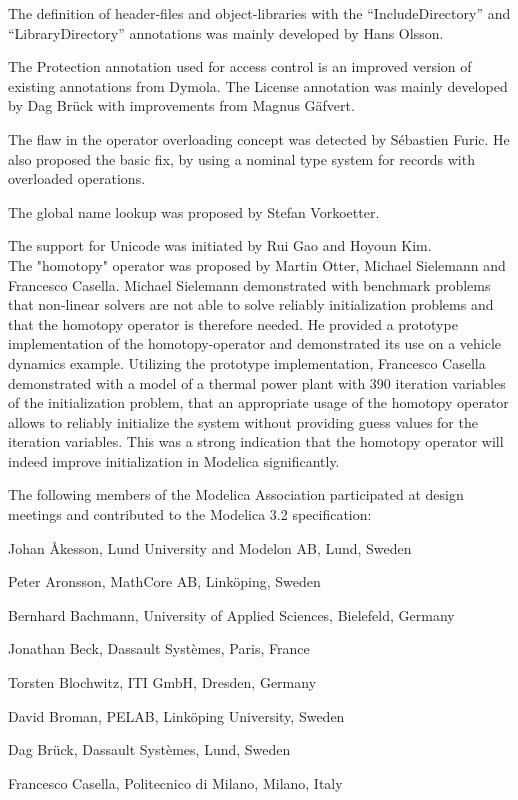 The definition of header-files and object-libraries with the
``IncludeDirectory'' and ``LibraryDirectory'' annotations was mainly
developed by Hans Olsson.

The Protection annotation used for access control is an improved version
of existing annotations from Dymola. The License annotation was mainly
developed by Dag Brück with improvements from Magnus Gäfvert.

The flaw in the operator overloading concept was detected by Sébastien
Furic. He also proposed the basic fix, by using a nominal type system
for records with overloaded operations.

The global name lookup was proposed by Stefan Vorkoetter.

The support for Unicode was initiated by Rui Gao and Hoyoun Kim.\\
The "homotopy" operator was proposed by Martin Otter, Michael Sielemann
and Francesco Casella. Michael Sielemann demonstrated with benchmark
problems that non-linear solvers are not able to solve reliably
initialization problems and that the homotopy operator is therefore
needed. He provided a prototype implementation of the homotopy-operator
and demonstrated its use on a vehicle dynamics example. Utilizing the
prototype implementation, Francesco Casella demonstrated with a model of
a thermal power plant with 390 iteration variables of the initialization
problem, that an appropriate usage of the homotopy operator allows to
reliably initialize the system without providing guess values for the
iteration variables. This was a strong indication that the homotopy
operator will indeed improve initialization in Modelica significantly.

The following members of the Modelica Association participated at design
meetings and contributed to the Modelica 3.2 specification:

Johan Åkesson, Lund University and Modelon AB, Lund, Sweden

Peter Aronsson, MathCore AB, Linköping, Sweden

Bernhard Bachmann, University of Applied Sciences, Bielefeld, Germany

Jonathan Beck, Dassault Systèmes, Paris, France

Torsten Blochwitz, ITI GmbH, Dresden, Germany

David Broman, PELAB, Linköping University, Sweden

Dag Brück, Dassault Systèmes, Lund, Sweden

Francesco Casella, Politecnico di Milano, Milano, Italy

